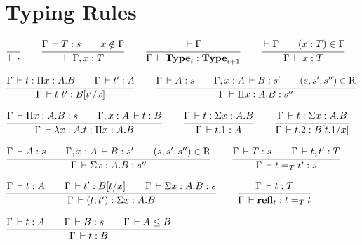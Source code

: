 \documentclass[a4paper,english]{lipics-utf8x}
\begin{document}
  \section{Typing Rules}

  \begin{center}
  \(
    \ru{}{\der \cdot}
    \qquad
    \ru{\Gamma \der T : s \qquad
        x \notin \Gamma
      }{\der \Gamma, x : T}
    \qquad
    \ru{\der \Gamma
      }{\Gamma \der \Type_i : \Type_{i+1}}
    \qquad
    \ru{\der \Gamma \qquad
        (x : T) \in \Gamma
      }{\Gamma \der x : T}
  \)
  \end{center}

  \begin{center}
  \(
    \ru{\Gamma \der t : \Pi x:A.B \qquad
        \Gamma \der t' : A
      }{\Gamma \der t\ t' : B[t'/x]}
    \qquad
    \ru{\Gamma \der A : s \qquad
        \Gamma, x:A \der B : s' \qquad
        (s,s',s'') \in \R
      }{\Gamma \der \Pi x:A.B : s''}
  \)
  \end{center}

  \begin{center}
  \(
    \ru{\Gamma \der \Pi x:A.B : s \qquad
        \Gamma, x:A \der t : B
      }{\Gamma \der \lambda x:A.t : \Pi x:A.B}
    \qquad
    \ru{\Gamma \der t : \Sigma x:A.B
      }{\Gamma \der t.1 : A}
    \qquad
    \ru{\Gamma \der t : \Sigma x:A.B
      }{\Gamma \der t.2 : B[t.1/x]}
  \)
  \end{center}

  \begin{center}
  \(
    \ru{\Gamma \der A : s \qquad
        \Gamma, x:A \der B : s' \qquad
        (s,s',s'') \in \R
      }{\Gamma \der \Sigma x:A.B : s''}
    \qquad
    \ru{\Gamma \der T : s \qquad
        \Gamma \der t,t' : T
      }{\Gamma \der t =_T t' : s}
  \)
  \end{center}

  \begin{center}
  \(
    \ru{\Gamma \der t : A \qquad
        \Gamma \der t' : B[t/x] \qquad
        \Gamma \der \Sigma x:A.B : s
      }{\Gamma \der (t;t') : \Sigma x:A.B}
    \qquad
    \ru{\Gamma \der t : T
      }{\Gamma \der \refl_t : t =_T t}
  \)
  \end{center}

  \begin{center}
  \(
    \ru{\Gamma \der t : A \qquad
        \Gamma \der B : s \qquad
        \Gamma \der A \le B
      }{\Gamma \der t : B}
  \)
  \end{center}
\end{document}

